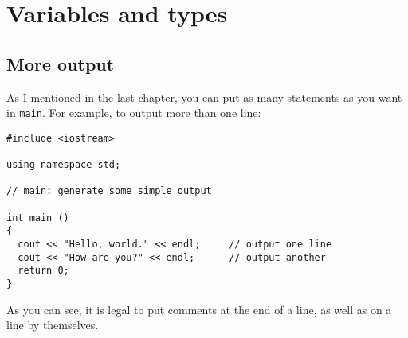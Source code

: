 





\chapter{Variables and types}

\section{More output}

As I mentioned in the last chapter, you can put as many statements as
you want in {\tt main}.  For example, to output more than one line:

\begin{lstlisting}
#include <iostream>

using namespace std;

// main: generate some simple output

int main ()
{
  cout << "Hello, world." << endl;     // output one line
  cout << "How are you?" << endl;      // output another
  return 0;
}
\end{lstlisting}
%
As you can see, it is legal to put comments at the
end of a line, as well as on a line by themselves.

